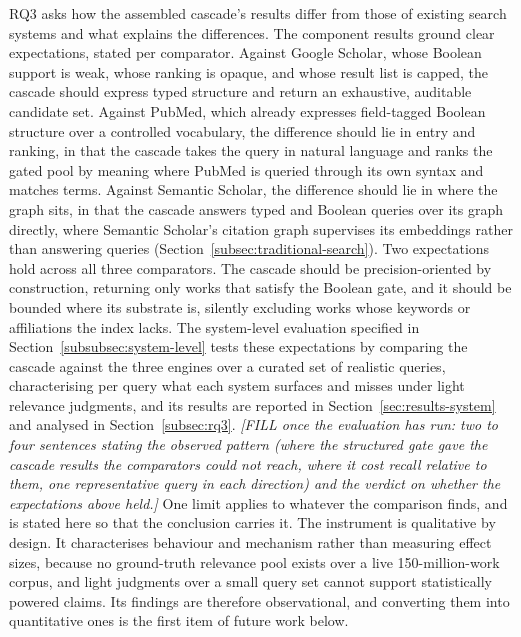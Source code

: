 RQ3 asks how the assembled cascade's results differ from those of existing search systems and what explains the differences. The component results ground clear expectations, stated per comparator. Against Google Scholar, whose Boolean support is weak, whose ranking is opaque, and whose result list is capped, the cascade should express typed structure and return an exhaustive, auditable candidate set. Against PubMed, which already expresses field-tagged Boolean structure over a controlled vocabulary, the difference should lie in entry and ranking, in that the cascade takes the query in natural language and ranks the gated pool by meaning where PubMed is queried through its own syntax and matches terms. Against Semantic Scholar, the difference should lie in where the graph sits, in that the cascade answers typed and Boolean queries over its graph directly, where Semantic Scholar's citation graph supervises its embeddings rather than answering queries (Section~\ref{subsec:traditional-search}). Two expectations hold across all three comparators. The cascade should be precision-oriented by construction, returning only works that satisfy the Boolean gate, and it should be bounded where its substrate is, silently excluding works whose keywords or affiliations the index lacks. The system-level evaluation specified in Section~\ref{subsubsec:system-level} tests these expectations by comparing the cascade against the three engines over a curated set of realistic queries, characterising per query what each system surfaces and misses under light relevance judgments, and its results are reported in Section~\ref{sec:results-system} and analysed in Section~\ref{subsec:rq3}. \emph{[FILL once the evaluation has run: two to four sentences stating the observed pattern (where the structured gate gave the cascade results the comparators could not reach, where it cost recall relative to them, one representative query in each direction) and the verdict on whether the expectations above held.]} One limit applies to whatever the comparison finds, and is stated here so that the conclusion carries it. The instrument is qualitative by design. It characterises behaviour and mechanism rather than measuring effect sizes, because no ground-truth relevance pool exists over a live 150-million-work corpus, and light judgments over a small query set cannot support statistically powered claims. Its findings are therefore observational, and converting them into quantitative ones is the first item of future work below.

